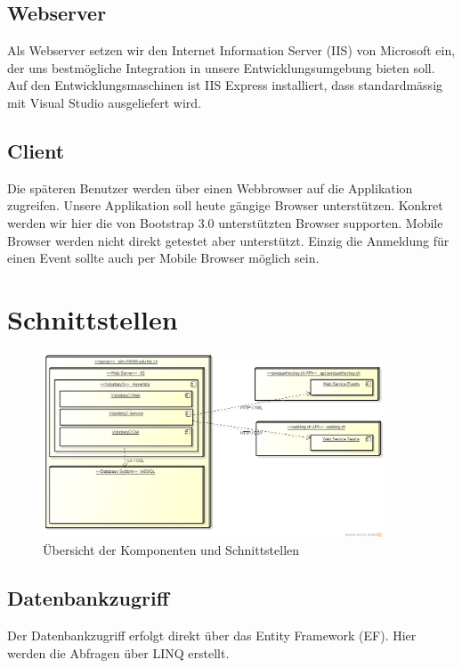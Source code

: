		\subsection{Webserver}
		Als Webserver setzen wir den Internet Information Server (IIS) von Microsoft ein, der uns bestmögliche Integration in unsere Entwicklungsumgebung bieten soll. Auf den Entwicklungsmaschinen ist IIS Express installiert, dass standardmässig mit Visual Studio ausgeliefert wird.
		\subsection{Client}
		Die späteren Benutzer werden über einen Webbrowser auf die Applikation zugreifen. Unsere Applikation soll heute gängige Browser unterstützen. Konkret werden wir hier die von Bootstrap 3.0 unterstützten Browser supporten. Mobile Browser werden nicht direkt getestet aber unterstützt. Einzig die Anmeldung für einen Event sollte auch per Mobile Browser möglich sein.

	\section{Schnittstellen}
	    \begin{figure}[h]
	  		\vspace{-5pt}
	    	\centering
	    	\includegraphics[width=0.9\textwidth]{content/architekturdokumentation/images/uebersicht_der_komponenten.png}
	  		\vspace{-25pt}
	    	\caption{Übersicht der Komponenten und Schnittstellen}
		\end{figure}

		\subsection{Datenbankzugriff}
		Der Datenbankzugriff erfolgt direkt über das Entity Framework (EF). Hier werden die Abfragen über LINQ erstellt.

